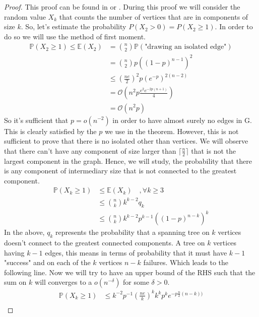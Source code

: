 \begin{proof}
This proof can be found in \cite{Spencer14} or \cite{Bollob01}.
\newline
During this proof we will consider the random value $X_k$ that counts the number of vertices that are in components of size $k$.
So, let's estimate the probability $P(X_2 > 0) = P(X_2 \geq 1 )$. In order to do so we will use the method of first moment.
\begin{align}
	\mathbb{P}(X_2 \geq 1) \leq \mathbb{E}(X_2) 	&= \binom{n}{2}\mathbb{P}(\text{"drawing an isolated edge"}) \\
						    	&= \binom{n}{2}p((1-p)^{n-1})^2 \\
							&\leq (\frac{ne}{2})^2p(e^{-p})^{2(n-2)} \\
						    	&= \mathcal{O}\left(n^2p \frac{ e^2 e^{-2p(n+1)} }{4}\right) \\
							&= \mathcal{O}(n^2p)
\end{align}
So it's sufficient that $p = o(n^{-2})$ in order to have almost surely no edges in G. This is clearly satisfied by the $p$ we use in the theorem.
\newline
However, this is not sufficient to prove that there is no isolated other than vertices. We will observe that there can't have any component of size larger than $\lceil \frac{n}{2} \rceil$ that is not the largest component in the graph.
Hence, we will study, the probability that there is any component of intermediary size that is not connected to the greatest component.
\begin{align}
	\mathbb{P}(X_k \geq 1) &\leq \mathbb{E}(X_k)\quad, \forall k \geq 3 \\
				&\leq \binom{n}{k} k^{k-2} q_k\\
				&\leq \binom{n}{k} k^{k-2} p^{k-1} ((1-p)^{n-k})^k
\end{align}
In the above, $q_k$ represents the probability that a spanning tree on $k$ vertices doesn't connect to the greatest connected components. A tree on $k$ vertices having $k-1$ edges, this means in terms of probability that it must have $k-1$ "success" and on each of the $k$ vertices $n-k$ failures. Which leads to the following line.
\newline 
Now we will try to have an upper bound of the RHS such that the sum on $k$ will converges to a $o(n^{-\delta})$ for some $\delta >0$.
\begin{align}
	\mathbb{P}(X_k \geq 1) 	
	            &\leq k^{-2}p^{-1}(\frac{ne}{k})^k k^{k} p^{k} e^{-p\frac{n}{2}(n-k))}\\

\end{align}
\end{proof}
